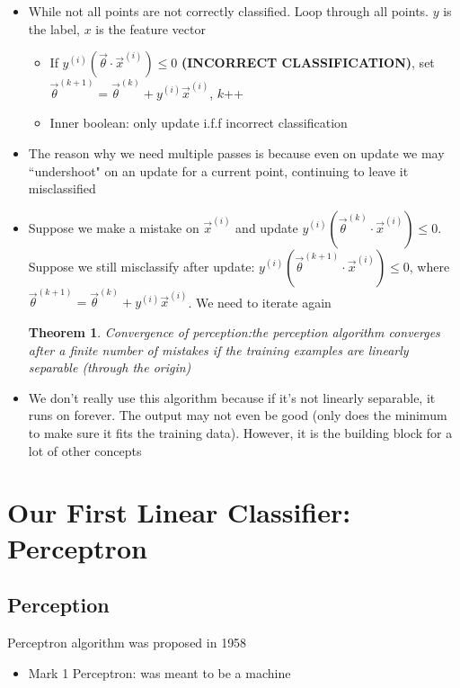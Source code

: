 \documentclass[10pt, oneside]{article}
\newtheorem{thm}{Theorem}
\begin{document}
\begin{itemize}
\begin{itemize}
\begin{itemize}
            \item While not all points are not correctly classified. Loop through all points. $y$ is the label, $x$ is the feature vector
            \begin{itemize}
                \item If $y^{(i)}(\vec \theta \cdot \vec x^{(i)})\leq 0$ \textbf{(INCORRECT CLASSIFICATION)}, set $\vec \theta^{(k+1)} =\vec \theta^{(k)} + y^{(i)} \vec x^{(i)}$, $k$++
                \item Inner boolean: only update i.f.f incorrect classification
            \end{itemize}
            \item The reason why we need multiple passes is because even on update we may ``undershoot" on an update for a current point, continuing to leave it misclassified
            \item Suppose we make a mistake on $\vec x^{(i)}$ and update $y^{(i)} (\vec \theta ^{(k)} \cdot \vec x ^{(i)})\leq 0$. Suppose we still misclassify after update: $y^{(i)} (\vec \theta ^{(k+1)} \cdot \vec x^{(i)} )\leq 0$, where $\vec \theta ^{(k+1)} = \vec \theta ^{(k)} + y^{(i)}\vec x^{(i)}$. We need to iterate again
            \begin{thm} {Convergence of perception:the perception algorithm converges after a finite number of mistakes if the training examples are linearly separable (through the origin)}\end{thm}
            \item We don't really use this algorithm because if it's not linearly separable, it runs on forever. The output may not even be good (only does the minimum to make sure it fits the training data). However, it is the building block for a lot of other concepts
        \end{itemize}
    \end{itemize}
\end{itemize}

\section{Our First Linear Classifier: Perceptron}
\subsection{Perception}

Perceptron algorithm was proposed in 1958
\begin{itemize}
    \item Mark 1 Perceptron: was meant to be a machine
\end{itemize}
\end{document}

